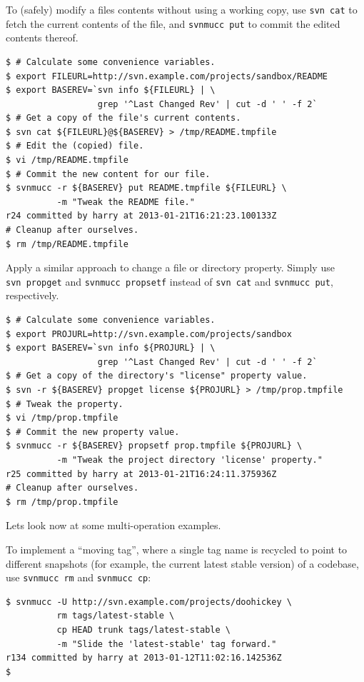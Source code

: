 To (safely) modify a file\textquotesingle s contents without using a
working copy, use \texttt{svn\ cat} to fetch the current contents of the
file, and \texttt{svnmucc\ put} to commit the edited contents thereof.

\begin{verbatim}
$ # Calculate some convenience variables.
$ export FILEURL=http://svn.example.com/projects/sandbox/README
$ export BASEREV=`svn info ${FILEURL} | \
                  grep '^Last Changed Rev' | cut -d ' ' -f 2`
$ # Get a copy of the file's current contents.
$ svn cat ${FILEURL}@${BASEREV} > /tmp/README.tmpfile
$ # Edit the (copied) file.
$ vi /tmp/README.tmpfile
$ # Commit the new content for our file.
$ svnmucc -r ${BASEREV} put README.tmpfile ${FILEURL} \
          -m "Tweak the README file."
r24 committed by harry at 2013-01-21T16:21:23.100133Z
# Cleanup after ourselves.
$ rm /tmp/README.tmpfile
\end{verbatim}

Apply a similar approach to change a file or directory property. Simply
use \texttt{svn\ propget} and \texttt{svnmucc\ propsetf} instead of
\texttt{svn\ cat} and \texttt{svnmucc\ put}, respectively.

\begin{verbatim}
$ # Calculate some convenience variables.
$ export PROJURL=http://svn.example.com/projects/sandbox
$ export BASEREV=`svn info ${PROJURL} | \
                  grep '^Last Changed Rev' | cut -d ' ' -f 2`
$ # Get a copy of the directory's "license" property value.
$ svn -r ${BASEREV} propget license ${PROJURL} > /tmp/prop.tmpfile
$ # Tweak the property.
$ vi /tmp/prop.tmpfile
$ # Commit the new property value.
$ svnmucc -r ${BASEREV} propsetf prop.tmpfile ${PROJURL} \
          -m "Tweak the project directory 'license' property."
r25 committed by harry at 2013-01-21T16:24:11.375936Z
# Cleanup after ourselves.
$ rm /tmp/prop.tmpfile
\end{verbatim}

Let\textquotesingle s look now at some multi-operation examples.

To implement a ``moving tag'', where a single tag name is recycled to
point to different snapshots (for example, the current latest stable
version) of a codebase, use \texttt{svnmucc\ rm} and
\texttt{svnmucc\ cp}:

\begin{verbatim}
$ svnmucc -U http://svn.example.com/projects/doohickey \
          rm tags/latest-stable \
          cp HEAD trunk tags/latest-stable \
          -m "Slide the 'latest-stable' tag forward."
r134 committed by harry at 2013-01-12T11:02:16.142536Z
$ 
\end{verbatim}

